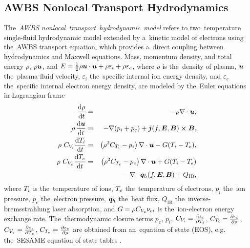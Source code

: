 \subsection{AWBS Nonlocal Transport Hydrodynamics}
\label{sec:ANTH}
The~\textit{AWBS nonlocal~transport~hydrodynamic~model}
refers to two~temperature single-fluid hydrodynamic model 
extended by a~kinetic model of electrons using the~AWBS transport equation,
which provides a~direct coupling between hydrodynamics and Maxwell equations.
Mass, momentum density, and total energy 
$\rho$, $\rho\boldsymbol{u}$, and 
$E = \frac{1}{2}\rho\boldsymbol{u}\cdot\boldsymbol{u} + 
 \rho \varepsilon_i + \rho \varepsilon_e$, 
where $\rho$ is 
the~density of plasma, $\boldsymbol{u}$ the~plasma fluid velocity, $\varepsilon_i$ 
the~specific internal ion energy density, 
and $\varepsilon_e$ the~specific internal 
electron energy density,
are modeled by the~Euler equations in Lagrangian frame 
\begin{eqnarray}
 \frac{\text{d} \rho}{\text{d} t} &=& - \rho\nabla\cdot\boldsymbol{u}
 , 
 \label{eq:NTH_rho}\\
 \rho\, \frac{\text{d} \boldsymbol{u}}{\text{d} t} &=& - \nabla (p_i + p_e) 
 + \boldsymbol{j}(f, \boldsymbol{E}, \boldsymbol{B}) \boldsymbol{\times}\boldsymbol{B}
 ,  
 \label{eq:NTH_v}\\
 \rho~C_{V_i}\frac{\text{d} T_i}{\text{d} t} 
 &=& 
 \left(\rho^2 C_{T_i} - p_i\right)\nabla\cdot\boldsymbol{u} 
 - G(T_i - T_e)
 ,  
 \label{eq:NTH_Ti}\\
 \rho~C_{V_e} \frac{\text{d} T_e}{\text{d} t}
  &=& 
 \left(\rho^2 C_{T_e} - p_e \right) \nabla\cdot\boldsymbol{u}  
 + G(T_i - T_e)
 \nonumber\\ 
 && - \nabla\cdot\boldsymbol{q}_h(f, \boldsymbol{E}, \boldsymbol{B}) + Q_{\text{IB}} 
 , 
 \label{eq:NTH_Te}
\end{eqnarray}
where $T_i$ is the~temperature of ions, $T_e$ the~temperature of electrons,
$p_i$ the~ion pressure, $p_e$ the~electron pressure,
$\boldsymbol{q}_h$ the~heat flux, $Q_{\text{IB}}$ the~inverse-bremsstrahlung laser 
absorption, and 
$G = \rho C_{V_e} \nu_{ei}$ is 
the~ion-electron energy exchange rate. 
The~thermodynamic closure terms 
$p_e$, $p_i$, 
$C_{V_i} = \frac{\partial \varepsilon_i}{\partial T_i}$, 
$C_{T_i} = \frac{\partial{\varepsilon_i}}{\partial{\rho}}$,
$C_{V_e} = \frac{\partial \varepsilon_e}{\partial T_e}$, 
$C_{T_e} = \frac{\partial{\varepsilon_e}}{\partial{\rho}}$
are obtained from an~equation of state (EOS), e.g.
the~SESAME equation of state tables
\cite{T4_SESAME_83, Lyon_SESAME_EOS_database-TechRep-92}.

